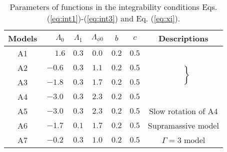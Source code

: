 \documentclass[twocolumn,superscriptaddress,showpacs,prl,aps,amsmath,amssymb,nofootinbib]{revtex4-1}
\begin{document}
\begin{table}
\caption{Parameters of functions in the integrability conditions Eqs.
(\ref{eq:int1})-(\ref{eq:int3}) and Eq. (\ref{eq:xi}).}
\label{tab:param}
\begin{tabular}{ccccccc}
\hline
Models & $\phantom{-}\Lambda_0$ & $\Lambda_1$ & $\Lambda_{\phi0}$ & $b$ & $c$ & Descriptions \\
\hline
A1 & $\phantom{-}1.6$ & $0.3$ & $0.0$ & $0.2$ & $0.5$ & 
                \multirow{4}{*}{$\left.\begin{array}{l}
                        \\
                        \\
                        \\
                        \\
                \end{array}\right\rbrace$} 
                \multirow{3}{*}{$\begin{array}{l}
                        \\
                        \mbox{Systematic change} \\
                        \mbox{in } B_{\rm tor}^{\rm max}/B_{\rm pol}^{\rm max}
                \end{array}$}   \\                   
A2 & $-0.6$ & $0.3$ & $1.1$ & $0.2$ & $0.5$ &  \\
A3 & $-1.8$ & $0.3$ & $1.7$ & $0.2$ & $0.5$ &  \\
A4 & $-3.0$ & $0.3$ & $2.3$ & $0.2$ & $0.5$ &  \\
A5 & $-3.0$ & $0.3$ & $2.3$ & $0.2$ & $0.5$ & Slow rotation of A4 \\
A6 & $-1.7$ & $0.1$ & $1.7$ & $0.2$ & $0.5$ & Supramassive model \\
A7 & $-0.2$ & $0.3$ & $1.0$ & $0.2$ & $0.5$ & $\Gamma=3$ model \\
\hline
\end{tabular}
\end{table}
\end{document}

